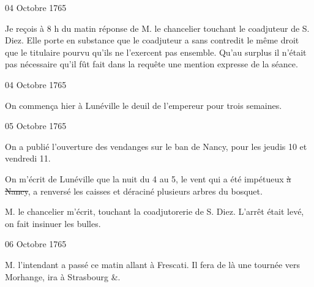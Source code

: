                      \begin{diary}{04 Octobre 1765}{}

                         Je reçois à 8 h du matin réponse de
                              M.
                              le chancelier touchant le
                              coadjuteur de S. Diez.
                           Elle porte en substance que le coadjuteur a
                           sans contredit le même droit que le titulaire
                           pourvu qu'ils ne l'exercent pas ensemble. Qu'au
                           surplus il n'était pas nécessaire qu'il fût fait
                           dans la requête une mention expresse de la
                           séance. \bigskip


                     \end{diary}

                     \begin{diary}{04 Octobre 1765}{}

                         On commença hier à Lunéville le deuil
                           de l'empereur pour
                           trois semaines. \bigskip


                     \end{diary}

                     \begin{diary}{05 Octobre 1765}{}

                         On a publié l'ouverture des vendanges
                           sur le ban de Nancy, pour les jeudis 10 et vendredi 11.
                        \bigskip


                         On m'écrit de Lunéville que la nuit du 4
                              au 5, le vent qui a été
                           impétueux \sout{à Nancy},
                           a renversé les caisses et déraciné plusieurs
                           arbres du bosquet. \bigskip



                           M. le chancelier m'écrit,
                           touchant la
                           coadjutorerie de S. Diez.
                           L'arrêt était levé,
                           on fait insinuer les bulles. \bigskip


                     \end{diary}

                     \begin{diary}{06 Octobre 1765}{}


                           M. l'intendant a passé ce matin
                           allant
                           à Frescati. Il fera de là une
                           tournée
                           vers Morhange, ira à
                              Strasbourg \&. \bigskip


                     \end{diary}

